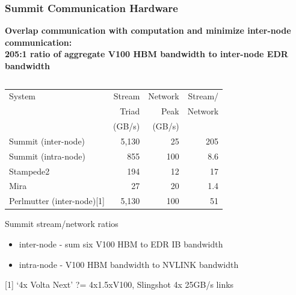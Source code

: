 \documentclass[aspectratio=169]{beamer}
\begin{document}
\begin{frame}
  \frametitle{Summit Communication Hardware}
  \textbf{Overlap communication with computation and minimize inter-node
  communication:\\
  205:1 ratio of aggregate V100 HBM bandwidth to inter-node EDR bandwidth}
    \begin{columns}
    \begin{column}{0.7\textwidth}
      \small
      \begin{table}[]
        \begin{tabular}{lrrr}
        System                      & Stream & Network & Stream/ \\
                                    & Triad  & Peak    & Network \\
                                    & (GB/s) & (GB/s)  & \\
        Summit (inter-node)         & 5,130  & 25      & 205     \\
        Summit (intra-node)         & 855    & 100     & 8.6     \\
        Stampede2                   & 194    & 12      & 17      \\
        Mira                        & 27     & 20      & 1.4 \\
        \hline
        Perlmutter (inter-node)[1] & 5,130  & 100     & 51   \\
        \hline
        \end{tabular}
      \end{table}
      {\small
        Summit stream/network ratios
        \begin{itemize}
          \item inter-node - sum six V100 HBM to EDR IB bandwidth
          \item intra-node - V100 HBM bandwidth to NVLINK bandwidth
        \end{itemize}
        [1] `4x Volta Next' ?= 4x1.5xV100, Slingshot 4x 25GB/s links
      }
    \end{column}
    \begin{column}{0.3\textwidth}
      \begin{figure}
        \centering

\end{figure}
\end{column}
\end{columns}
\end{frame}
\end{document}
